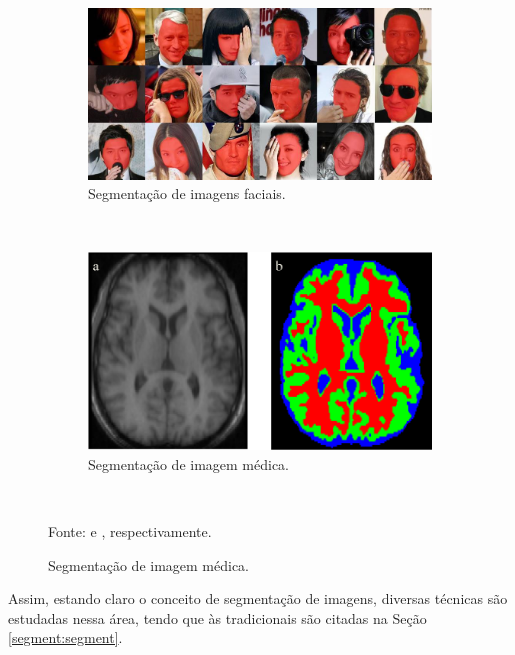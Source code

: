 \begin{figure}[H]
   \caption{Exemplos de segmentações de imagens.}
   \centering
   \label{segment:fig:1}
    \begin{subfigure}[t]{0.5\textwidth}
        \centering
        \includegraphics[width=1\linewidth]{recursos/imagens/image_seg/faces.png}
        \caption{Segmentação de imagens faciais.}
        \label{segment:fig:1.1}
    \end{subfigure}%
    ~ 

    \begin{subfigure}[t]{0.5\textwidth}
        \centering
        \includegraphics[width=1\linewidth]{recursos/imagens/image_seg/cerebro.png}
        \caption{Segmentação de imagem médica.}
        \label{segment:fig:1.2}
    \end{subfigure}%
    ~

    Fonte: \cite{Nirkin2018} e \cite{Withey2008}, respectivamente.
\end{figure}

Assim, estando claro o conceito de segmentação de imagens, diversas técnicas são estudadas nessa área, tendo que às tradicionais são citadas na Seção \ref{segment:segment}.


